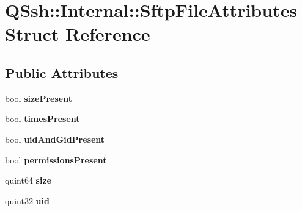 \hypertarget{struct_q_ssh_1_1_internal_1_1_sftp_file_attributes}{}\section{Q\+Ssh\+:\+:Internal\+:\+:Sftp\+File\+Attributes Struct Reference}
\label{struct_q_ssh_1_1_internal_1_1_sftp_file_attributes}
\subsection*{Public Attributes}
\begin{DoxyCompactItemize}
\item 
\mbox{\label{struct_q_ssh_1_1_internal_1_1_sftp_file_attributes_addd2e7035057cddc5e238f8f02ff0388}} 
bool {\bfseries size\+Present}
\item 
\mbox{\label{struct_q_ssh_1_1_internal_1_1_sftp_file_attributes_a2801c1bffebfd3f2c8259e4a88ecaae2}} 
bool {\bfseries times\+Present}
\item 
\mbox{\label{struct_q_ssh_1_1_internal_1_1_sftp_file_attributes_a2106db4a91d236934b0b9c7a1f5d4cff}} 
bool {\bfseries uid\+And\+Gid\+Present}
\item 
\mbox{\label{struct_q_ssh_1_1_internal_1_1_sftp_file_attributes_af87600530a63d99cbebfa30601317b8f}} 
bool {\bfseries permissions\+Present}
\item 
\mbox{\label{struct_q_ssh_1_1_internal_1_1_sftp_file_attributes_a084a5c50f8bcc133c335bcffe20068f8}} 
quint64 {\bfseries size}
\item 
\mbox{\label{struct_q_ssh_1_1_internal_1_1_sftp_file_attributes_aceba75f68be9f52d4400cb88f9839475}} 
quint32 {\bfseries uid}
\item 
\mbox{\label{struct_q_ssh_1_1_internal_1_1_sftp_file_attributes_a83c9b2f160cc75837f186ad5c4f04239}} 

\end{DoxyCompactItemize}
